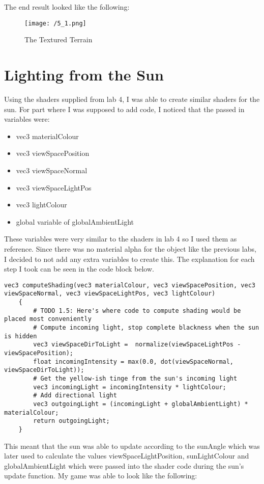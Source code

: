 \documentclass[11pt, oneside, a4paper]{article}
\begin{document}
 The end result looked like the following:
 \begin{figure}[!ht]
	\centerline{\texttt{[image: /5\_1.png]}}
	\caption{The Textured Terrain}
	\label{fig:figure5}
\end{figure}

\section{Lighting from the Sun}
Using the shaders supplied from lab 4, I was able to create similar shaders for the sun. For part where I was supposed to add code, I noticed that the passed in variables were:
\begin{itemize}
	\item{vec3 materialColour}
	\item{vec3 viewSpacePosition}
	\item{vec3 viewSpaceNormal}
	\item{vec3 viewSpaceLightPos}
	\item{vec3 lightColour}
	\item{global variable of globalAmbientLight}
\end{itemize}

These variables were very similar to the shaders in lab 4 so I used them as reference. Since there was no material alpha for the object like the previous labs, I decided to not add any extra variables to create this. The explanation for each step I took can be seen in the code block below.

\begin{lstlisting}  
vec3 computeShading(vec3 materialColour, vec3 viewSpacePosition, vec3 viewSpaceNormal, vec3 viewSpaceLightPos, vec3 lightColour)
    {
        # TODO 1.5: Here's where code to compute shading would be placed most conveniently
        # Compute incoming light, stop complete blackness when the sun is hidden
        vec3 viewSpaceDirToLight = 	normalize(viewSpaceLightPos - viewSpacePosition);
        float incomingIntensity = max(0.0, dot(viewSpaceNormal, viewSpaceDirToLight));
        # Get the yellow-ish tinge from the sun's incoming light
        vec3 incomingLight = incomingIntensity * lightColour;
        # Add directional light
        vec3 outgoingLight = (incomingLight + globalAmbientLight) * materialColour;
        return outgoingLight;
    }
\end{lstlisting}

This meant that the sun was able to update according to the sunAngle which was later used to calculate the values viewSpaceLightPosition, sunLightColour and globalAmbientLight which were passed into the shader code during the sun's update function. My game was able to look like the following:
\end{document}
